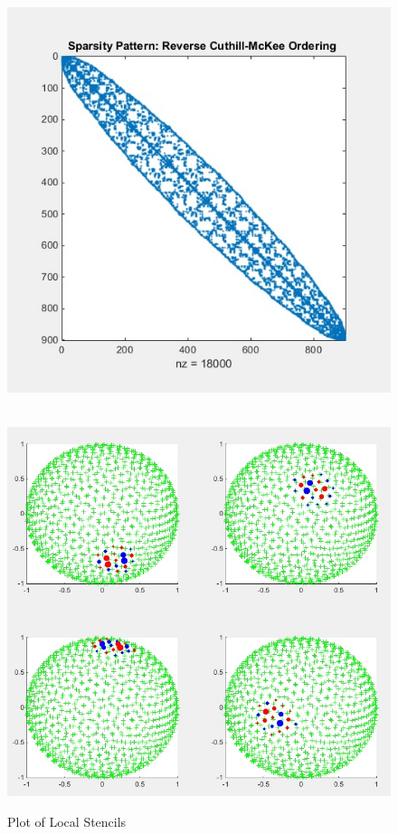 \documentclass[11pt]{article}
\begin{document}
\begin{figure}[h!]
\begin{minipage}{.33\hsize}
  \centering
\includegraphics[scale=0.5]{FD_RBF_sparse02.jpg}
\label{fig:rbfFDdiffmatRCM}\
\end{minipage}

\end{figure}

\begin{figure}[h!]
\centering
\includegraphics[scale=0.4]{RBF_FD_stencils.jpg}\\
\caption{Plot of Local Stencils}
\label{fig:localStencilWeights}
\end{figure}
\end{document}
